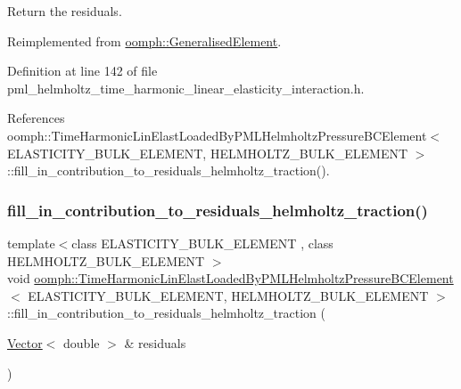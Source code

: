 Return the residuals. 



Reimplemented from \hyperlink{classoomph_1_1GeneralisedElement_a310c97f515e8504a48179c0e72c550d7}{oomph\+::\+Generalised\+Element}.



Definition at line 142 of file pml\+\_\+helmholtz\+\_\+time\+\_\+harmonic\+\_\+linear\+\_\+elasticity\+\_\+interaction.\+h.



References oomph\+::\+Time\+Harmonic\+Lin\+Elast\+Loaded\+By\+P\+M\+L\+Helmholtz\+Pressure\+B\+C\+Element$<$ E\+L\+A\+S\+T\+I\+C\+I\+T\+Y\+\_\+\+B\+U\+L\+K\+\_\+\+E\+L\+E\+M\+E\+N\+T, H\+E\+L\+M\+H\+O\+L\+T\+Z\+\_\+\+B\+U\+L\+K\+\_\+\+E\+L\+E\+M\+E\+N\+T $>$\+::fill\+\_\+in\+\_\+contribution\+\_\+to\+\_\+residuals\+\_\+helmholtz\+\_\+traction().

\mbox{\label{classoomph_1_1TimeHarmonicLinElastLoadedByPMLHelmholtzPressureBCElement_a7012451bb562db8a3c8c07542699f6c8}} 
\subsubsection{\texorpdfstring{fill\+\_\+in\+\_\+contribution\+\_\+to\+\_\+residuals\+\_\+helmholtz\+\_\+traction()}{fill\_in\_contribution\_to\_residuals\_helmholtz\_traction()}}
{\footnotesize\ttfamily template$<$class E\+L\+A\+S\+T\+I\+C\+I\+T\+Y\+\_\+\+B\+U\+L\+K\+\_\+\+E\+L\+E\+M\+E\+NT , class H\+E\+L\+M\+H\+O\+L\+T\+Z\+\_\+\+B\+U\+L\+K\+\_\+\+E\+L\+E\+M\+E\+NT $>$ \\
void \hyperlink{classoomph_1_1TimeHarmonicLinElastLoadedByPMLHelmholtzPressureBCElement}{oomph\+::\+Time\+Harmonic\+Lin\+Elast\+Loaded\+By\+P\+M\+L\+Helmholtz\+Pressure\+B\+C\+Element}$<$ E\+L\+A\+S\+T\+I\+C\+I\+T\+Y\+\_\+\+B\+U\+L\+K\+\_\+\+E\+L\+E\+M\+E\+NT, H\+E\+L\+M\+H\+O\+L\+T\+Z\+\_\+\+B\+U\+L\+K\+\_\+\+E\+L\+E\+M\+E\+NT $>$\+::fill\+\_\+in\+\_\+contribution\+\_\+to\+\_\+residuals\+\_\+helmholtz\+\_\+traction (\begin{DoxyParamCaption}\item[{\hyperlink{classoomph_1_1Vector}{Vector}$<$ double $>$ \&}]{residuals }\end{DoxyParamCaption})\hspace{0.3cm}{\ttfamily [protected]}}



